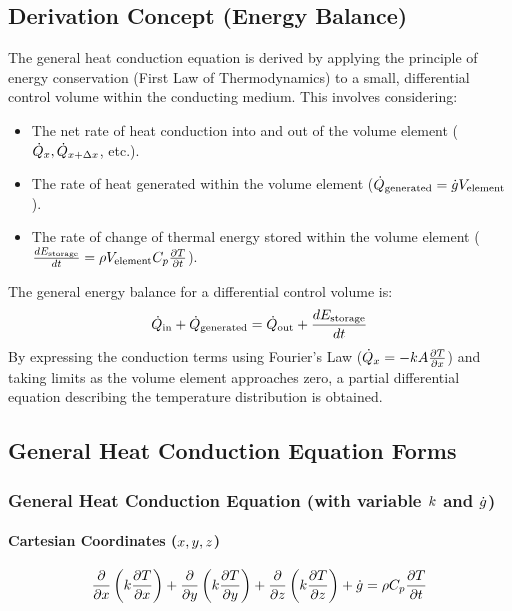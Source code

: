 \subsection{Derivation Concept (Energy Balance)}
The general heat conduction equation is derived by applying the principle of energy conservation (First Law of Thermodynamics) to a small, differential control volume within the conducting medium. This involves considering:
\begin{itemize}
    \item The net rate of heat conduction into and out of the volume element ($\dot{Q}_x, \dot{Q}_{x+\Delta x}$, etc.).
    \item The rate of heat generated within the volume element ($\dot{Q}_{\text{generated}} = \dot{g} V_{\text{element}}$).
    \item The rate of change of thermal energy stored within the volume element ($\frac{d E_{\text{storage}}}{d t} = \rho V_{\text{element}} C_p \frac{\partial T}{\partial t}$).
\end{itemize}
The general energy balance for a differential control volume is:
\begin{equation}
\label{eq:general_energy_balance_differential_theory}
    \dot{Q}_{\text{in}} + \dot{Q}_{\text{generated}} = \dot{Q}_{\text{out}} + \frac{d E_{\text{storage}}}{d t}
\end{equation}
By expressing the conduction terms using Fourier's Law ($\dot{Q}_x = -k A \frac{\partial T}{\partial x}$) and taking limits as the volume element approaches zero, a partial differential equation describing the temperature distribution is obtained.

\subsection{General Heat Conduction Equation Forms}
\subsubsection*{General Heat Conduction Equation (with variable $k$ and $\dot{g}$)}
\paragraph*{Cartesian Coordinates ($x, y, z$)}
\begin{equation}
\label{eq:hce_cartesian_variable_k_theory}
    \frac{\partial}{\partial x}\left(k \frac{\partial T}{\partial x}\right) + \frac{\partial}{\partial y}\left(k \frac{\partial T}{\partial y}\right) + \frac{\partial}{\partial z}\left(k \frac{\partial T}{\partial z}\right) + \dot{g} = \rho C_p \frac{\partial T}{\partial t}
\end{equation}

